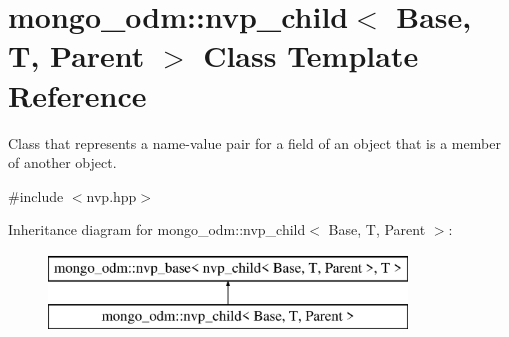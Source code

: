 \hypertarget{classmongo__odm_1_1nvp__child}{}\section{mongo\+\_\+odm\+:\+:nvp\+\_\+child$<$ Base, T, Parent $>$ Class Template Reference}
\label{classmongo__odm_1_1nvp__child}


Class that represents a name-\/value pair for a field of an object that is a member of another object.  




{\ttfamily \#include $<$nvp.\+hpp$>$}

Inheritance diagram for mongo\+\_\+odm\+:\+:nvp\+\_\+child$<$ Base, T, Parent $>$\+:\begin{figure}[H]
\begin{center}
\leavevmode
\includegraphics[height=2.000000cm]{classmongo__odm_1_1nvp__child}
\end{center}
\end{figure}
